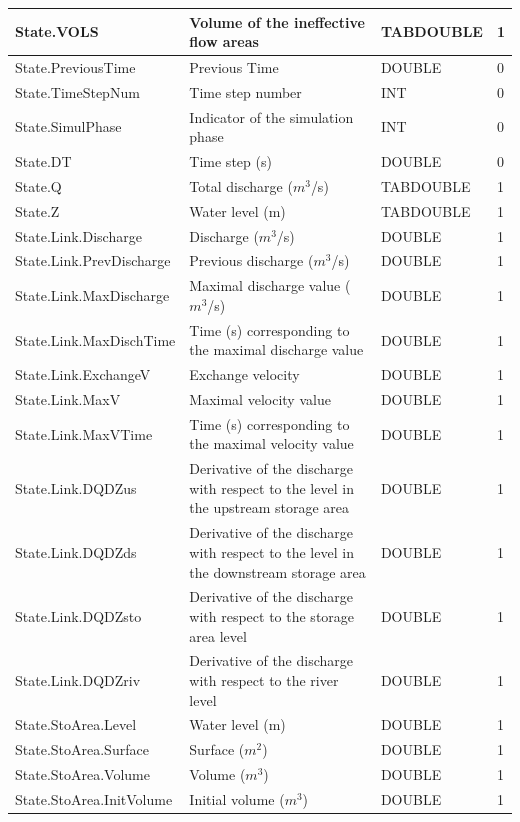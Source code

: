 \documentclass[a4paper,11pt]{article}
\begin{document}
\begin{landscape}
\begin{table}[ht]
\begin{center}
\begin{tabular}{|l|l|l|l|}
\hline  State.VOLS & Volume of the ineffective flow areas & TABDOUBLE & 1 \\
\hline  State.PreviousTime & Previous Time & DOUBLE & 0 \\
\hline  State.TimeStepNum & Time step number & INT & 0 \\
\hline  State.SimulPhase & Indicator of the simulation phase & INT & 0 \\
\hline  State.DT & Time step (s) & DOUBLE & 0 \\
\hline  State.Q & Total discharge ($m^3$/s) & TABDOUBLE & 1 \\
\hline  State.Z & Water level (m) & TABDOUBLE & 1 \\
\hline  State.Link.Discharge & Discharge ($m^3$/s) & DOUBLE & 1 \\
\hline  State.Link.PrevDischarge & Previous discharge ($m^3$/s) & DOUBLE & 1 \\
\hline  State.Link.MaxDischarge & Maximal discharge value ($m^3$/s) & DOUBLE & 1 \\
\hline  State.Link.MaxDischTime & Time (s) corresponding to the maximal discharge value & DOUBLE & 1 \\
\hline  State.Link.ExchangeV & Exchange velocity & DOUBLE & 1 \\
\hline  State.Link.MaxV & Maximal velocity value & DOUBLE & 1 \\
\hline  State.Link.MaxVTime & Time (s) corresponding to the maximal velocity value & DOUBLE & 1 \\
\hline  State.Link.DQDZus & Derivative of the discharge with respect to the level in the upstream storage area & DOUBLE & 1 \\
\hline  State.Link.DQDZds & Derivative of the discharge with respect to the level in the downstream storage area & DOUBLE & 1 \\
\hline  State.Link.DQDZsto & Derivative of the discharge with respect to the storage area level & DOUBLE & 1 \\
\hline  State.Link.DQDZriv & Derivative of the discharge with respect to the river level & DOUBLE & 1 \\
\hline  State.StoArea.Level & Water level (m) & DOUBLE & 1 \\
\hline  State.StoArea.Surface & Surface ($m^2$) & DOUBLE & 1 \\
\hline  State.StoArea.Volume & Volume ($m^3$) & DOUBLE & 1 \\
\hline  State.StoArea.InitVolume & Initial volume ($m^3$) & DOUBLE & 1 \\

\end{tabular}
\end{center}
\end{table}
\end{landscape}
\end{document}
